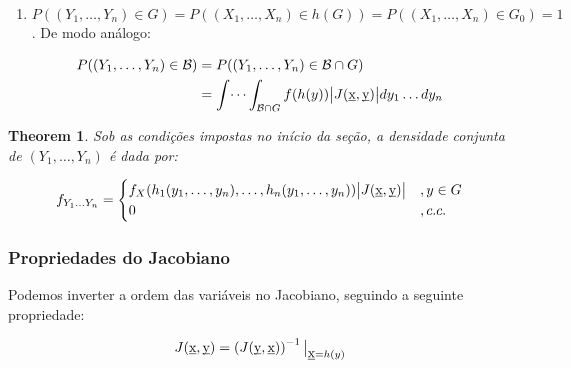 \documentclass[
]{article}
\providecommand{\tightlist}{%
  \setlength{\itemsep}{0pt}\setlength{\parskip}{0pt}}
\newtheorem{theorem}{Theorem}[section]
\theoremstyle{definition}
\theoremstyle{definition}
\theoremstyle{definition}
\theoremstyle{definition}
\theoremstyle{remark}
\begin{document}
\begin{enumerate}
\def\labelenumi{\arabic{enumi}.}
\setcounter{enumi}{1}
\tightlist
\item
  \(P((Y_{1},\ldots,Y_{n}) \in G) = P((X_{1}, \ldots, X_{n}) \in h(G)) = P((X_{1}, \ldots, X_{n}) \in G_{0}) = 1\). De modo análogo:
\end{enumerate}

\begin{align*}
P((Y_{1}, \ldots, Y_{n}) \in \mathcal{B}) &= P((Y_{1}, \ldots, Y_{n}) \in \mathcal{B} \cap G) \\
&= \int \dots \int_{\mathcal{B} \cap G}f(h(y))\big{|}J(\underbar{x},\underbar{y})\big{|}dy_{1} \ldots dy_{n}
\end{align*}

\begin{theorem}
Sob as condições impostas no início da seção, a densidade conjunta de \((Y_{1}, \ldots, Y_{n})\) é dada por:

\begin{equation*}
f_{Y_{1}\ldots Y_{n}} = \begin{cases}
f_{X}(h_{1}(y_{1},\ldots,y_{n}), \ldots, h_{n}(y_{1},\ldots,y_{n}))\big{|}J(\underbar{x},\underbar{y})\big{|} & ,y \in G \\
0 & ,c.c.
\end{cases}
\end{equation*}
\end{theorem}

\hypertarget{propriedades-do-jacobiano}{%
\subsubsection{Propriedades do Jacobiano}\label{propriedades-do-jacobiano}}

Podemos inverter a ordem das variáveis no Jacobiano, seguindo a seguinte propriedade:

\begin{equation}
J(\underbar{x},\underbar{y}) = \left(J(\underbar{y},\underbar{x})\right)^{-1}\big{|}_{\underbar{x} = h(y)}
\label{eq:inversajacobiano}
\end{equation}
\end{document}
